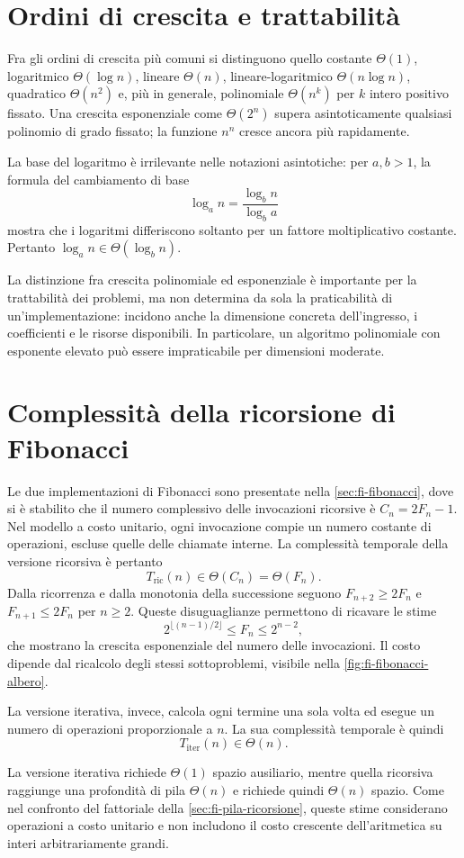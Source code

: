 \clearpage

\section{Ordini di crescita e trattabilità}
\label{sec:fi-complessita-ordini}

Fra gli ordini di crescita più comuni si distinguono quello costante
\(\Theta(1)\), logaritmico \(\Theta(\log n)\), lineare \(\Theta(n)\),
lineare-logaritmico \(\Theta(n\log n)\), quadratico \(\Theta(n^2)\)
e, più in generale, polinomiale \(\Theta(n^k)\) per \(k\) intero
positivo fissato. Una crescita esponenziale come \(\Theta(2^n)\)
supera asintoticamente qualsiasi polinomio di grado fissato;
la funzione \(n^n\) cresce ancora più rapidamente.

La base del logaritmo è irrilevante nelle notazioni asintotiche:
per \(a,b>1\), la formula del cambiamento di base
\[
  \log_a n=\frac{\log_b n}{\log_b a}
\]
mostra che i logaritmi differiscono soltanto per un fattore
moltiplicativo costante. Pertanto
\(\log_a n\in\Theta(\log_b n)\).

La distinzione fra crescita polinomiale ed esponenziale è importante
per la trattabilità dei problemi, ma non determina da sola la
praticabilità di un'implementazione: incidono anche la dimensione
concreta dell'ingresso, i coefficienti e le risorse disponibili.
In particolare, un algoritmo polinomiale con esponente elevato può
essere impraticabile per dimensioni moderate.

\section{Complessità della ricorsione di Fibonacci}
\label{sec:fi-complessita-fibonacci}

Le due implementazioni di Fibonacci sono presentate nella
\cref{sec:fi-fibonacci}, dove si è stabilito che il numero complessivo
delle invocazioni ricorsive è \(C_n=2F_n-1\).
Nel modello a costo unitario, ogni invocazione compie un numero
costante di operazioni, escluse quelle delle chiamate interne.
La complessità temporale della versione ricorsiva è pertanto
\[
  T_{\mathrm{ric}}(n)\in\Theta(C_n)=\Theta(F_n).
\]
Dalla ricorrenza e dalla monotonia della successione seguono
\(F_{n+2}\ge2F_n\) e \(F_{n+1}\le2F_n\) per \(n\ge2\).
Queste disuguaglianze permettono di ricavare le stime
\[
  2^{\lfloor(n-1)/2\rfloor}\le F_n\le2^{n-2},
\]
che mostrano la crescita esponenziale del numero delle invocazioni.
Il costo dipende dal ricalcolo degli stessi sottoproblemi, visibile
nella \cref{fig:fi-fibonacci-albero}.

La versione iterativa, invece, calcola ogni termine una sola volta
ed esegue un numero di operazioni proporzionale a \(n\). La sua
complessità temporale è quindi
\[
  T_{\mathrm{iter}}(n)\in\Theta(n).
\]

La versione iterativa richiede \(\Theta(1)\) spazio ausiliario,
mentre quella ricorsiva raggiunge una profondità di pila
\(\Theta(n)\) e richiede quindi \(\Theta(n)\) spazio.
Come nel confronto del fattoriale della
\cref{sec:fi-pila-ricorsione}, queste stime considerano
operazioni a costo unitario e non includono il costo crescente
dell'aritmetica su interi arbitrariamente grandi.
